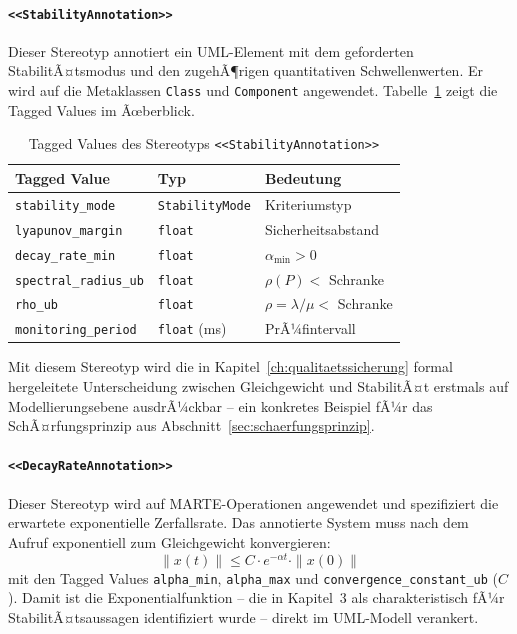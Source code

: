 ﻿\documentclass[a4paper,12pt]{report}
\theoremstyle{definition}
\begin{document}
\paragraph{\texttt{<<StabilityAnnotation>>}}

Dieser Stereotyp annotiert ein UML-Element mit dem geforderten
StabilitÃ¤tsmodus und den zugehÃ¶rigen quantitativen Schwellenwerten.
Er wird auf die Metaklassen \texttt{Class} und \texttt{Component}
angewendet. Tabelle~\ref{tab:stability-annotation} zeigt die Tagged Values
im Ãœberblick.

\begin{table}[H]
	\centering
	\begin{tabular}{@{}lll@{}}
		\toprule
		\textbf{Tagged Value} & \textbf{Typ} & \textbf{Bedeutung} \\
		\midrule
		\texttt{stability\_mode}      & \texttt{StabilityMode} & Kriteriumstyp \\
		\texttt{lyapunov\_margin}     & \texttt{float}         & Sicherheitsabstand \\
		\texttt{decay\_rate\_min}     & \texttt{float}         & $\alpha_{\min} > 0$ \\
		\texttt{spectral\_radius\_ub} & \texttt{float}         & $\rho(P) <$ Schranke \\
		\texttt{rho\_ub}              & \texttt{float}         & $\rho = \lambda/\mu <$ Schranke \\
		\texttt{monitoring\_period}   & \texttt{float} (ms)    & PrÃ¼fintervall \\
		\bottomrule
	\end{tabular}
	\caption{Tagged Values des Stereotyps \texttt{<<StabilityAnnotation>>}}
\label{tab:stability-tagged-values}
	\label{tab:stability-annotation}
\end{table}

Mit diesem Stereotyp wird die in Kapitel~\ref{ch:qualitaetssicherung} formal hergeleitete Unterscheidung zwischen Gleichgewicht und StabilitÃ¤t erstmals auf Modellierungsebene ausdrÃ¼ckbar -- ein konkretes Beispiel fÃ¼r das SchÃ¤rfungsprinzip aus Abschnitt~\ref{sec:schaerfungsprinzip}.

\paragraph{\texttt{<<DecayRateAnnotation>>}}

Dieser Stereotyp wird auf MARTE-Operationen angewendet und spezifiziert die
erwartete exponentielle Zerfallsrate. Das annotierte System muss nach dem
Aufruf exponentiell zum Gleichgewicht konvergieren:
\[
\|x(t)\| \leq C \cdot e^{-\alpha t} \cdot \|x(0)\|
\]
mit den Tagged Values \texttt{alpha\_min}, \texttt{alpha\_max} und
\texttt{convergence\_constant\_ub} ($C$). Damit ist die Exponentialfunktion
-- die in Kapitel~3 als charakteristisch fÃ¼r StabilitÃ¤tsaussagen
identifiziert wurde -- direkt im UML-Modell verankert.
\end{document}
